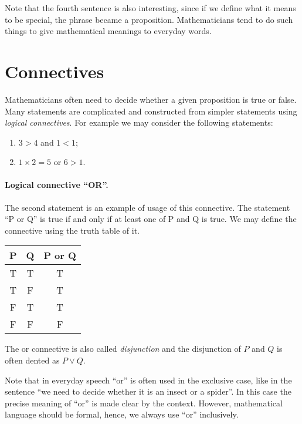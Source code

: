 Note that the fourth sentence is also interesting, since if we define what it
means to be special, the phrase became a proposition.
Mathematicians tend to do such things to give mathematical meanings to
everyday words.

\section{Connectives}

Mathematicians often need to decide whether a given proposition is true or
false. Many statements are complicated and constructed from simpler statements
using \textit{logical connectives}. For example we may consider the following
statements:
\begin{enumerate}
  \item $3 > 4$ and $1 < 1$;
  \item $1 \times 2 = 5$ or $6 > 1$.
\end{enumerate}

\paragraph{Logical connective ``OR''.}
The second statement is an example of usage of this connective. The statement
``P or Q'' is true if and only if at least one of P and Q is true. We may
define the connective using the truth table of it.
\begin{center}
  \begin{tabular}{c | c | c}
    P & Q & P or Q \\
    \hline
    T & T & T \\
    T & F & T \\
    F & T & T \\
    F & F & F
  \end{tabular}
\end{center}

The or connective is also called \textit{disjunction} and the disjunction of $P$
and $Q$ is often dented as $P \lor Q$.

\begin{warning}
  Note that in everyday speech ``or'' is often used in the exclusive case, like
  in the sentence ``we need to decide whether it is an insect or a spider''.
  In this case the precise meaning of ``or'' is made clear by the context.
  However, mathematical language should be formal, hence, we always use ``or''
  inclusively.
\end{warning}

